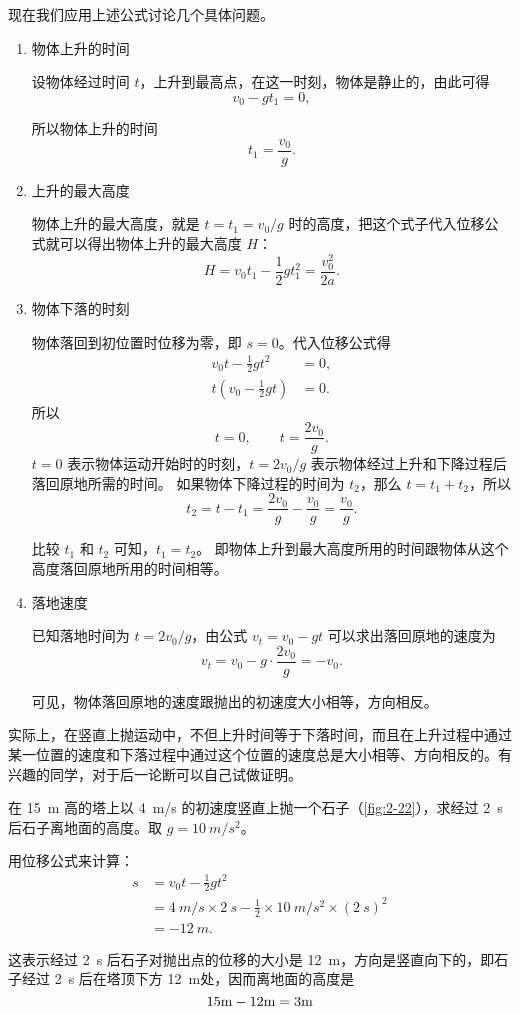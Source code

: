 现在我们应用上述公式讨论几个具体问题。
\begin{enumerate}[(1)]
	\item  物体上升的时间
	
	设物体经过时间 $t$，上升到最高点，在这一时刻，物体是静止的，由此可得
	\[v_0-gt_1=0, \]
	
	所以物体上升的时间
	\[t_1=\frac{v_0}{g}. \]
	
	\item 上升的最大高度
	
	物体上升的最大高度，就是 $t=t_1=v_0/g$ 时的高度，把这个式子代入位移公式就可以得出物体上升的最大高度 $H$：
	\[H=v_0t_1-\frac{1}{2}gt_1^2=\frac{v^2_0}{2a}. \]
	
	\item 物体下落的时刻
	
	物体落回到初位置时位移为零，即 $s=0$。代入位移公式得
	\[\begin{split}
	v_0 t-\frac{1}{2}gt^2&=0,\\
	t\left(v_0-\frac{1}{2}gt\right)&=0.
	\end{split} \]
	所以
	\[t=0,\qquad t=\frac{2v_0}{g}. \]
	$t=0$ 表示物体运动开始时的时刻，$t=2v_0/g$ 表示物体经过上升和下降过程后落回原地所需的时间。
  如果物体下降过程的时间为 $t_2$，那么 $t=t_1+t_2$，所以
	\[t_2=t-t_1=\frac{2v_0}{g}-\frac{v_0}{g}=\frac{v_0}{g}.\]
	
	比较 $t_1$ 和 $t_2$ 可知，$t_1=t_2$。
  即物体上升到最大高度所用的时间跟物体从这个高度落回原地所用的时间相等。
	
	\item 落地速度
	
	已知落地时间为 $t=2v_0/g$，由公式 $v_t=v_0-gt$ 可以求出落回原地的速度为
	\[v_t=v_0-g\cdot \frac{2v_0}{g}=-v_0. \]
	
	可见，物体落回原地的速度跟抛出的初速度大小相等，方向相反。
\end{enumerate}

实际上，在竖直上抛运动中，不但上升时间等于下落时间，而且在上升过程中通过某一位置的速度和下落过程中通过这个位置的速度总是大小相等、方向相反的。有兴趣的同学，对于后一论断可以自己试做证明。

\begin{example}
在 \qty{15}{m} 高的塔上以 \qty{4}{m/s} 的初速度竖直上抛一个石子（\cref{fig:2-22}），求经过 \qty{2}{s} 后石子离地面的高度。取 $g=\qty{10}{m/s^2}$。
\end{example}

\begin{solution}
用位移公式来计算：
\[\begin{split}
s&=v_0 t-\frac{1}{2}gt^2\\
&=\qty{4}{m/s} \times \qty{2}{s}-\frac{1}{2}\times \qty{10}{m/s^2} \times (\qty{2}{s})^2\\
&=\qty{-12}{m}.
\end{split} \]

这表示经过 \qty{2}{s} 后石子对抛出点的位移的大小是 \qty{12}{m}，方向是竖直向下的，即石子经过 \qty{2}{s} 后在塔顶下方 \qty{12}{m}处，因而离地面的高度是
\[15{\rm m}-12{\rm m}=3{\rm m}\]
\end{solution}

